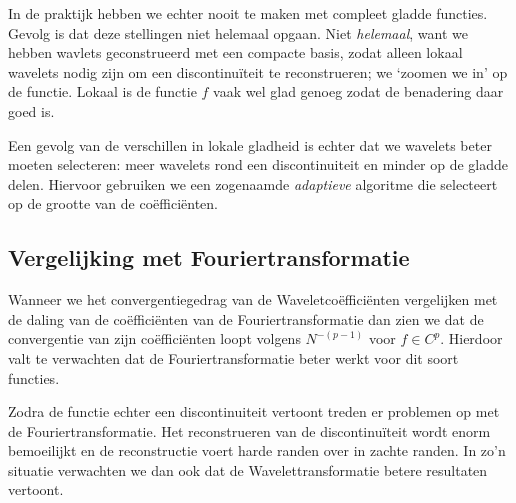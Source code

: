 In de praktijk hebben we echter nooit te maken met compleet gladde functies. 
Gevolg is dat deze stellingen niet helemaal opgaan. 
Niet \emph{helemaal}, want we hebben wavlets geconstrueerd met een compacte basis, zodat alleen 
lokaal wavelets nodig zijn om een discontinu\"iteit te reconstrueren; we `zoomen we in' op de functie. 
Lokaal is de functie $f$ vaak wel glad genoeg zodat de benadering daar goed is.

Een gevolg van de verschillen in lokale gladheid is echter dat we wavelets beter moeten selecteren: meer wavelets rond een discontinuiteit en minder op de gladde delen. 
Hiervoor gebruiken we een zogenaamde \emph{adaptieve} algoritme die selecteert op de grootte van de co\"effici\"enten.

\subsection{Vergelijking met Fouriertransformatie}
Wanneer we het convergentiegedrag van de Waveletco\"effici\"enten vergelijken met de daling 
van de co\"effici\"enten van de Fouriertransformatie dan zien we dat de convergentie van zijn
co\"effici\"enten loopt volgens $N^{-(p-1)}$ voor $f\in C^p$. Hierdoor valt te verwachten dat 
de Fouriertransformatie beter werkt voor dit soort functies.

Zodra de functie echter een discontinuiteit vertoont treden er problemen op met de Fouriertransformatie.
Het reconstrueren van de discontinu\"iteit wordt enorm bemoeilijkt en de reconstructie voert harde randen over
in zachte randen. In zo'n situatie verwachten we dan ook dat de Wavelettransformatie betere resultaten vertoont.
